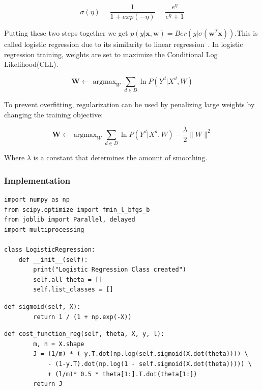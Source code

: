 \documentclass[letterpaper,10pt]{article}
\DeclareMathOperator*{\argmax}{argmax}
\theoremstyle{mytheor}
\begin{document}
\begin{equation}
\sigma(\eta) = \frac{1}{1 + exp(-\eta)} = \frac{e^{\eta}}{e^{\eta} + 1}
\end{equation}

Putting these two steps together we get $p(y|\boldsymbol{x},\boldsymbol{w}) = Ber(y|\sigma( \boldsymbol{w}^{T}\boldsymbol{x}))$.This is called logistic regression due to its similarity to linear regression~\cite{murphy2012machine}. 
In logistic regression training, weights are set to maximize the Conditional Log Likelihood(CLL).

\begin{equation}
\boldsymbol{W} \leftarrow \argmax_{W} \sum_{d \in D} \ln P(Y^d|X^d, W)
\end{equation}

To prevent overfitting, regularization can be used by penalizing large weights by changing the training objective:

\begin{equation}
\boldsymbol{W} \leftarrow \argmax_{W} \sum_{d \in D} \ln P(Y^d|X^d, W) - \frac{\lambda}{2}\parallel W \parallel^2 
\end{equation}

Where $\lambda$ is a constant that determines the amount of smoothing. 

\subsubsection{Implementation}
\begin{lstlisting}[label={list:first},caption=Class Definition]
import numpy as np
from scipy.optimize import fmin_l_bfgs_b
from joblib import Parallel, delayed
import multiprocessing

class LogisticRegression:
    def __init__(self):
        print("Logistic Regression Class created")
        self.all_theta = []
        self.list_classes = []
\end{lstlisting}

\begin{lstlisting}[label={list:second},caption=Sigmoid Function]
	def sigmoid(self, X):
		return 1 / (1 + np.exp(-X))
\end{lstlisting}

\begin{lstlisting}[label={list:third},caption=Cost Function]
	def cost_function_reg(self, theta, X, y, l):
        m, n = X.shape
        J = (1/m) * (-y.T.dot(np.log(self.sigmoid(X.dot(theta)))) \ 
        	- (1-y.T).dot(np.log(1 - self.sigmoid(X.dot(theta))))) \
            + (l/m)* 0.5 * theta[1:].T.dot(theta[1:])
        return J
\end{lstlisting}
\end{document}
